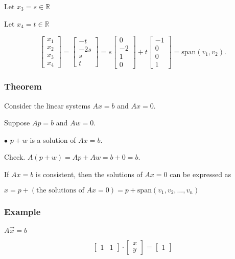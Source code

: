 \documentclass[12pt]{article}
\begin{document}
Let $x_3 = s \in \mathbb{R}$

Let $x_4 = t \in \mathbb{R}$

\[
  \begin{bmatrix}
    x_1 \\ x_2 \\ x_3 \\ x_4
  \end{bmatrix}
  =
  \begin{bmatrix}
    -t \\ -2s \\ s \\ t
  \end{bmatrix}
  =
  s
  \begin{bmatrix}
    0 \\ -2 \\ 1 \\ 0
  \end{bmatrix}
  +
  t
  \begin{bmatrix}
    -1 \\ 0 \\ 0 \\ 1
  \end{bmatrix}
  = \text{span}(v_1, v_2).
\]

\subsubsection*{Theorem}

Consider the linear systems $Ax=b$ and $Ax=0$.

Suppose $Ap=b$ and $Aw=0$. 

$\bullet$ $p+w$ is a solution of $Ax=b$.

Check. $A(p+w) = Ap + Aw = b + 0 = b$.

If $Ax=b$ is consistent, then the solutions of $Ax=0$ can be expressed as

$x = p + (\text{the solutions of } Ax=0) = p+\text{span}(v_1, v_2, \dots, v_n)$

\subsubsection*{Example}

$A\vec{x} = b$

\[
\begin{bmatrix}
  1 & 1
  \end{bmatrix}
  \cdot
  \begin{bmatrix}
    x \\ y
  \end{bmatrix}
=
\begin{bmatrix}
  1
\end{bmatrix}
\]
\end{document}
